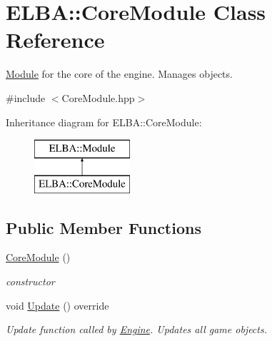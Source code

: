 \hypertarget{class_e_l_b_a_1_1_core_module}{}\section{E\+L\+BA\+:\+:Core\+Module Class Reference}
\label{class_e_l_b_a_1_1_core_module}


\mbox{\hyperlink{class_e_l_b_a_1_1_module}{Module}} for the core of the engine. Manages objects.  




{\ttfamily \#include $<$Core\+Module.\+hpp$>$}

Inheritance diagram for E\+L\+BA\+:\+:Core\+Module\+:\begin{figure}[H]
\begin{center}
\leavevmode
\includegraphics[height=2.000000cm]{class_e_l_b_a_1_1_core_module}
\end{center}
\end{figure}
\subsection*{Public Member Functions}
\begin{DoxyCompactItemize}
\item 
\mbox{\label{class_e_l_b_a_1_1_core_module_a329d759e13e82905d86fc2586977064d}} 
\mbox{\hyperlink{class_e_l_b_a_1_1_core_module_a329d759e13e82905d86fc2586977064d}{Core\+Module}} ()
\begin{DoxyCompactList}\small\item\em constructor \end{DoxyCompactList}\item 
\mbox{\label{class_e_l_b_a_1_1_core_module_a8a1cd3d0a6f1ae195187c45a3cfee744}} 
void \mbox{\hyperlink{class_e_l_b_a_1_1_core_module_a8a1cd3d0a6f1ae195187c45a3cfee744}{Update}} () override
\begin{DoxyCompactList}\small\item\em Update function called by \mbox{\hyperlink{class_e_l_b_a_1_1_engine}{Engine}}. Updates all game objects. \end{DoxyCompactList}\end{DoxyCompactItemize}


